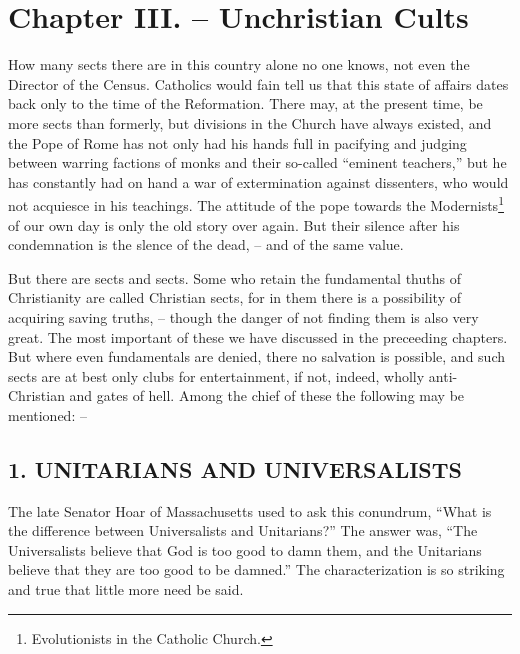 \documentclass[
]{book}
\begin{document}
\hypertarget{chapter-iii.-unchristian-cults}{%
\section*{Chapter III. -- Unchristian Cults}\label{chapter-iii.-unchristian-cults}}

How many sects there are in this country alone no one knows, not even the Director of the Census. Catholics would fain tell us that this state of affairs dates back only to the time of the Reformation. There may, at the present time, be more sects than formerly, but divisions in the Church have always existed, and the Pope of Rome has not only had his hands full in pacifying and judging between warring factions of monks and their so-called ``eminent teachers,'' but he has constantly had on hand a war of extermination against dissenters, who would not acquiesce in his teachings. The attitude of the pope towards the Modernists\footnote{Evolutionists in the Catholic Church.} of our own day is only the old story over again. But their silence after his condemnation is the slence of the dead, -- and of the same value.

But there are sects and sects. Some who retain the fundamental thuths of Christianity are called Christian sects, for in them there is a possibility of acquiring saving truths, -- though the danger of not finding them is also very great. The most important of these we have discussed in the preceeding chapters. But where even fundamentals are denied, there no salvation is possible, and such sects are at best only clubs for entertainment, if not, indeed, wholly anti-Christian and gates of hell. Among the chief of these the following may be mentioned: --

\hypertarget{unitarians-and-universalists}{%
\subsection*{\texorpdfstring{1. UNITARIANS AND UNIVERSALISTS}{1. UNITARIANS AND UNIVERSALISTS}}\label{unitarians-and-universalists}}

The late Senator Hoar of Massachusetts used to ask this conundrum, ``What is the difference between Universalists and Unitarians?'' The answer was, ``The Universalists believe that God is too good to damn them, and the Unitarians believe that they are too good to be damned.'' The characterization is so striking and true that little more need be said.
\end{document}
